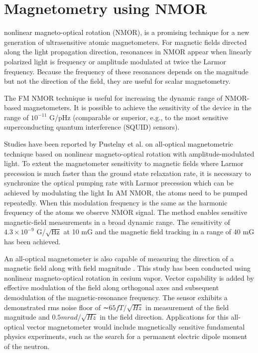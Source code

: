 \section{Magnetometry using NMOR}

nonlinear magneto-optical rotation (NMOR), is a promising technique for a new generation of ultrasensitive atomic magnetometers. For magnetic fields directed along the light propagation direction, resonances in NMOR appear when linearly polarized light is frequency or amplitude modulated at twice the Larmor frequency. Because the frequency of these resonances depends on the magnitude but not the direction of the field, they are useful for scalar magnetometry.

 The FM NMOR technique is useful for increasing the dynamic range of NMOR-based magnetometers.  It is possible to achieve the  sensitivity of the device in the range of  $10^{−11} $ G/pHz (comparable or superior, e.g., to the most sensitive superconducting quantum interference (SQUID) sensors)\cite{bib:FMNMOR}.

 Studies have been reported by  Pustelny et al. \cite{bib:AMNMOR,bib:amNMOR} on all-optical magnetometric technique based on nonlinear magneto-optical rotation with amplitude-modulated light. To extent the magnetometer sensitivity to magnetic fields where Larmor
precession is much faster than the ground state relaxation rate, it is
necessary to synchronize the optical pumping rate with Larmor
precession which can be achieved by modulating the light
\cite{doi:10.1063/1.3225917} In AM NMOR, the atoms need to be pumped repeatedly. When this modulation frequency is the same as the harmonic
frequency of the atoms we observe NMOR signal. The method enables sensitive magnetic-field measurements in a broad dynamic range. The sensitivity of  $4.3\times10^{-9}$ G/$\sqrt{\text{Hz}}$ at 10 mG and the magnetic field tracking in a range of 40 mG has been achieved. 

An all-optical magnetometer is also capable of measuring the direction of a magnetic field along with field magnitude \cite{bib:vectormagnetometer}.  This study has been conducted using nonlinear magneto-optical rotation in cesium vapor.  Vector capability is added by effective modulation of the field along orthogonal axes and subsequent demodulation of the magnetic-resonance frequency.  The sensor exhibits a demonstrated rms noise floor of ∼$65fT/ \sqrt {Hz}$ in measurement of the field magnitude and $ 0.5 mrad/\sqrt {Hz}$ in the field direction.  Applications for this all-optical vector magnetometer would include magnetically sensitive fundamental physics experiments, such as the search for a permanent electric dipole moment of the neutron. 

